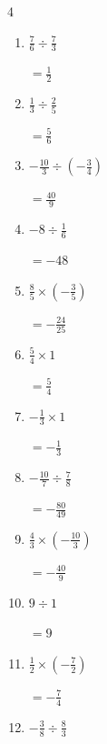 \begin{multicols}{4}
\begin{enumerate}
        $\displaystyle =\frac{1}{3}$

  \item $\displaystyle \frac{7}{6}\div{}\frac{7}{3}$

        $\displaystyle =\frac{1}{2}$

  \item $\displaystyle \frac{1}{3}\div{}\frac{2}{5}$

        $\displaystyle =\frac{5}{6}$

  \item $\displaystyle -\frac{10}{3}\div{}\left(-\frac{3}{4}\right)$

        $\displaystyle =\frac{40}{9}$

  \item $\displaystyle -8\div{}\frac{1}{6}$

        $\displaystyle =-48$

\columnbreak %

  \item $\displaystyle \frac{8}{5}\times{}\left(-\frac{3}{5}\right)$

        $\displaystyle =-\frac{24}{25}$

  \item $\displaystyle \frac{5}{4}\times{}1$

        $\displaystyle =\frac{5}{4}$

  \item $\displaystyle -\frac{1}{3}\times{}1$

        $\displaystyle =-\frac{1}{3}$

  \item $\displaystyle -\frac{10}{7}\div{}\frac{7}{8}$

        $\displaystyle =-\frac{80}{49}$

  \item $\displaystyle \frac{4}{3}\times{}\left(-\frac{10}{3}\right)$

        $\displaystyle =-\frac{40}{9}$

  \item $\displaystyle 9\div{}1$

        $\displaystyle =9$

  \item $\displaystyle \frac{1}{2}\times{}\left(-\frac{7}{2}\right)$

        $\displaystyle =-\frac{7}{4}$

  \item $\displaystyle -\frac{3}{8}\div{}\frac{8}{3}$


\end{enumerate}
\end{multicols}
